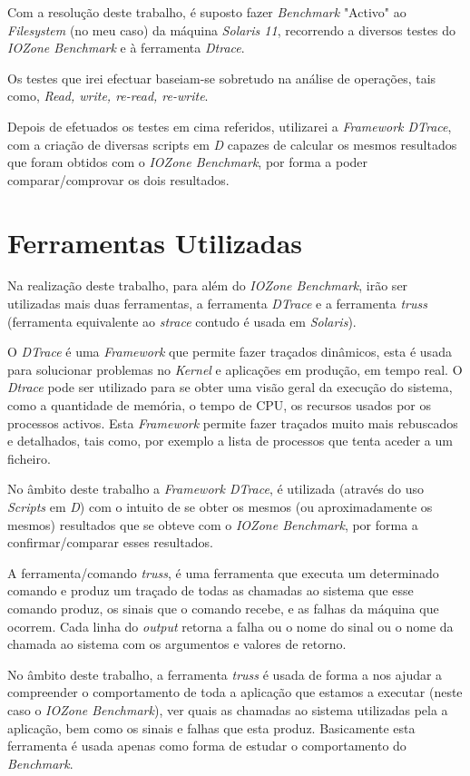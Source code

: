 \documentclass[conference,compsoc]{IEEEtran}
\begin{document}
Com a resolução deste trabalho, é suposto fazer \textit{Benchmark} "Activo" ao \textit{Filesystem} (no meu caso) da máquina \textit{Solaris 11}, recorrendo a diversos testes do \textit{IOZone Benchmark} e à ferramenta \textit{Dtrace}. 

Os testes que irei efectuar baseiam-se sobretudo na análise de operações, tais como, \textit{Read, write, re-read, re-write}.

Depois de efetuados os testes em cima referidos, utilizarei a \textit{Framework DTrace}, com a criação de diversas scripts em \textit{D} capazes de calcular os mesmos resultados que foram obtidos com o \textit{IOZone Benchmark}, por forma a poder comparar/comprovar os dois resultados.

\section{Ferramentas Utilizadas}
Na realização deste trabalho, para além do \textit{IOZone Benchmark}, irão ser utilizadas mais duas ferramentas, a ferramenta \textit{DTrace} e a ferramenta \textit{truss} (ferramenta equivalente ao \textit{strace} contudo é usada em \textit{Solaris}).

O \textit{DTrace} é uma \textit{Framework} que permite fazer traçados dinâmicos, esta é usada para solucionar problemas no \textit{Kernel} e aplicações em produção, em tempo real. O \textit{Dtrace} pode ser utilizado para se obter uma visão geral da execução do sistema, como a quantidade de memória, o tempo de CPU, os recursos usados por os processos activos. Esta \textit{Framework} permite fazer traçados muito mais rebuscados e detalhados, tais como, por exemplo a lista de processos que tenta aceder a um ficheiro.

No âmbito deste trabalho a \textit{Framework DTrace}, é utilizada (através do uso \textit{Scripts} em \textit{D}) com o intuito de se obter os mesmos (ou aproximadamente os mesmos) resultados que se obteve com o \textit{IOZone Benchmark}, por forma a confirmar/comparar esses resultados.

A ferramenta/comando \textit{truss}, é uma ferramenta que executa um determinado comando e produz um traçado de todas as chamadas ao sistema que esse comando produz, os sinais que o comando recebe, e as falhas da máquina que ocorrem. Cada linha do \textit{output} retorna a falha ou o nome do sinal ou o nome da chamada ao sistema com os argumentos e valores de retorno.

No âmbito deste trabalho, a ferramenta \textit{truss} é usada de forma a nos ajudar a compreender o comportamento de toda a aplicação que estamos a executar (neste caso o \textit{IOZone Benchmark}), ver quais as chamadas ao sistema utilizadas pela a aplicação, bem como os sinais e falhas que esta produz. Basicamente esta ferramenta é usada apenas como forma de estudar o comportamento do \textit{Benchmark}.
\end{document}
